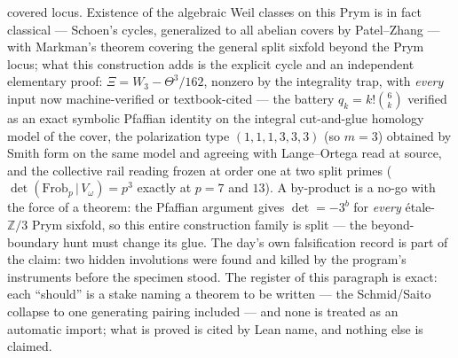 \documentclass[11pt]{article}
\theoremstyle{definition}
\theoremstyle{remark}
\begin{document}
covered locus. Existence of the algebraic Weil classes on this Prym is in
fact classical --- Schoen's cycles, generalized to all abelian covers by
Patel--Zhang \cite{PatelZhang} --- with Markman's theorem covering the
general split sixfold beyond the Prym locus; what this construction adds is
the explicit cycle and an independent elementary proof: $\Xi=W_3-\Theta^3/162$, nonzero by the
integrality trap, with \emph{every} input now machine-verified or
textbook-cited --- the battery $q_k=k!\binom{6}{k}$ verified as an exact
symbolic Pfaffian identity on the integral cut-and-glue homology model of
the cover, the polarization type $(1,1,1,3,3,3)$ (so $m=3$) obtained by
Smith form on the same model and agreeing with Lange--Ortega
\cite{LangeOrtega} read at source, and the collective rail reading frozen at
order one at two split primes ($\det(\mathrm{Frob}_p\,|\,V_\omega)=p^3$
exactly at $p=7$ and $13$). A by-product is a no-go with the force of a
theorem: the Pfaffian argument gives $\det=-3^{b}$ for \emph{every}
\'etale-$\mathbb Z/3$ Prym sixfold, so this entire construction family is
split --- the beyond-boundary hunt must change its glue. The day's own
falsification record is part of the claim: two hidden involutions were found
and killed by the program's instruments before the specimen stood. The register of this paragraph is exact: each ``should'' is a stake
naming a theorem to be written --- the Schmid/Saito collapse to one generating
pairing included --- and none is treated as an automatic import; what is
proved is cited by Lean name, and nothing else is claimed.
\end{document}
